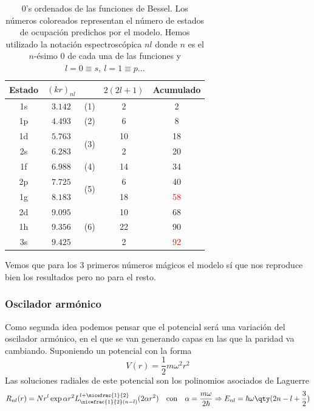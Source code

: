 \begin{table}[h]
\centering
\begin{tabular}{|ccccc|}
\hline
Estado & $(kr)_{nl}$ &                      & $2(2l+1)$ & Acumulado \\ \hline \hline
1s     & $3.142$       & (1)                  & 2         & \textcolor{applegreen}{2}         \\ \hline
1p     & $4.493$       & (2)                  & 6         & \textcolor{applegreen}{8}         \\ \hline
1d     & $5.763$       & \multirow{2}{*}{(3)} & 10        & 18        \\
2s     & $6.283$       &                      & 2         & \textcolor{applegreen}{20}        \\ \hline
1f     & $6.988$       & (4)                  & 14        & 34        \\ \hline
2p     & $7.725$       & \multirow{2}{*}{(5)} & 6         & 40        \\
1g     & $8.183$       &                      & 18        & \textcolor{red}{58}        \\ \hline
2d     & $9.095$       & \multirow{3}{*}{(6)} & 10        & 68        \\
1h     & $9.356$       &                      & 22        & 90        \\
3s     & $9.425$       &                      & 2         & \textcolor{red}{92}        \\ \hline
\end{tabular}
\caption{0's ordenados de las funciones de Bessel. Los números coloreados representan el número de estados de ocupación predichos por el modelo. Hemos utilizado la notación espectroscópica $nl$ donde $n$ es el $n$-ésimo 0 de cada una de las funciones y $l=0\equiv s, \ l=1\equiv p$... }
\label{tab: ceros de bessel}
\end{table}

Vemos que para los 3 primeros números mágicos el modelo sí que nos reproduce bien los resultados pero no para el resto.
\subsubsection{Oscilador armónico}
Como segunda idea podemos pensar que el potencial será una variación del oscilador armónico, en el que se van generando capas en las que la paridad va cambiando. Suponiendo un potencial con la forma
\begin{equation*}
    V(r)=\frac{1}{2}m\omega^2r^2
\end{equation*}
Las soluciones radiales de este potencial son los polinomios asociados de Laguerre
$$R_{nl}(r)=Nr^l \exp{\alpha r^2} L^{l+\nicefrac{1}{2}}_{\nicefrac{1}{2}(n-l)}(2\alpha r^2) \quad \text{con} \quad \alpha=\frac{m\omega}{2\hbar} \Rightarrow E_{nl}=\hbar \omega \qty(2n-l+\frac{3}{2})$$

